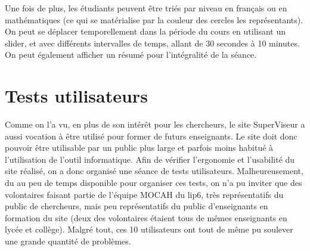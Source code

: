 \documentclass{article}
\begin{document}
\begin{itemize}
\begin{center}
        \end{center}
        Une fois de plus, les étudiants peuvent être triés par niveau en français ou en mathématiques (ce qui se matérialise par la couleur des cercles les représentants). On peut se déplacer temporellement dans la période du cours en utilisant un slider, et avec différents intervalles de temps, allant de 30 secondes à 10 minutes. On peut également afficher un résumé pour l'intégralité de la séance.\\
\end{itemize}

\section{Tests utilisateurs}
Comme on l'a vu, en plus de son intérêt pour les chercheurs, le site SuperViseur a aussi vocation à être utilisé pour former de futurs enseignants. Le site doit donc pouvoir être utilisable par un public plus large et parfois moins habitué à l'utilisation de l'outil informatique. Afin de vérifier l'ergonomie et l'usabilité du site réalisé, on a donc organisé une séance de tests utilisateurs. Malheureusement, du au peu de temps disponible pour organiser ces tests, on n'a pu inviter que des volontaires faisant partie de l'équipe MOCAH du lip6, très représentatifs du public de chercheurs, mais peu représentatifs du public d'enseignants en formation du site (deux des volontaires étaient tous de mêmes enseignants en lycée et collège). Malgré tout, ces 10 utilisateurs ont tout de même pu soulever une grande quantité de problèmes.
\end{document}
